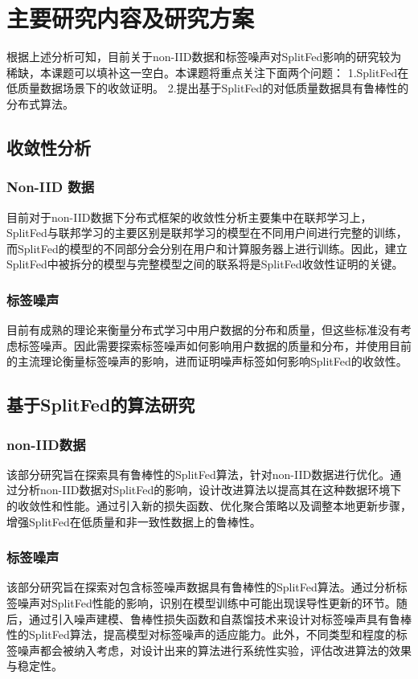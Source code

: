 \chapter{主要研究内容及研究方案}
根据上述分析可知，目前关于non-IID数据和标签噪声对SplitFed影响的研究较为稀缺，本课题可以填补这一空白。本课题将重点关注下面两个问题：
1.SplitFed在低质量数据场景下的收敛证明。
2.提出基于SplitFed的对低质量数据具有鲁棒性的分布式算法。
\section{收敛性分析}
\subsection{Non-IID 数据}
目前对于non-IID数据下分布式框架的收敛性分析主要集中在联邦学习上，SplitFed与联邦学习的主要区别是联邦学习的模型在不同用户间进行完整的训练，而SplitFed的模型的不同部分会分别在用户和计算服务器上进行训练。因此，建立SplitFed中被拆分的模型与完整模型之间的联系将是SplitFed收敛性证明的关键。
\subsection{标签噪声}
目前有成熟的理论来衡量分布式学习中用户数据的分布和质量，但这些标准没有考虑标签噪声。因此需要探索标签噪声如何影响用户数据的质量和分布，并使用目前的主流理论衡量标签噪声的影响，进而证明噪声标签如何影响SplitFed的收敛性。

\section{基于SplitFed的算法研究}
\subsection{non-IID数据}
该部分研究旨在探索具有鲁棒性的SplitFed算法，针对non-IID数据进行优化。通过分析non-IID数据对SplitFed的影响，设计改进算法以提高其在这种数据环境下的收敛性和性能。通过引入新的损失函数、优化聚合策略以及调整本地更新步骤，增强SplitFed在低质量和非一致性数据上的鲁棒性。
\subsection{标签噪声}
该部分研究旨在探索对包含标签噪声数据具有鲁棒性的SplitFed算法。通过分析标签噪声对SplitFed性能的影响，识别在模型训练中可能出现误导性更新的环节。随后，通过引入噪声建模、鲁棒性损失函数和自蒸馏技术来设计对标签噪声具有鲁棒性的SplitFed算法，提高模型对标签噪声的适应能力。此外，不同类型和程度的标签噪声都会被纳入考虑，对设计出来的算法进行系统性实验，评估改进算法的效果与稳定性。